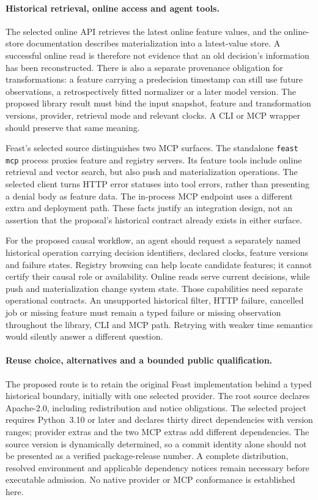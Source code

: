 \paragraph{Historical retrieval, online access and agent tools.}
The selected online API retrieves the latest online feature values, and the
online-store documentation describes materialization into a latest-value
store. A successful online read is therefore not evidence that an old
decision's information has been reconstructed. There is also a separate
provenance obligation for transformations: a feature carrying a predecision
timestamp can still use future observations, a retrospectively fitted
normalizer or a later model version. The proposed library result must bind
the input snapshot, feature and transformation versions, provider, retrieval
mode and relevant clocks. A CLI or MCP wrapper should preserve that same
meaning.~\citep{exec19_feast_source}

Feast's selected source distinguishes two MCP surfaces. The standalone
\texttt{feast mcp} process proxies feature and registry servers. Its feature
tools include online retrieval and vector search, but also push and
materialization operations. The selected client turns HTTP error statuses
into tool errors, rather than presenting a denial body as feature data. The
in-process MCP endpoint uses a different extra and deployment path. These
facts justify an integration design, not an assertion that the proposal's
historical contract already exists in either surface.~\citep{exec19_feast_source}

For the proposed causal workflow, an agent should request a separately named
historical operation carrying decision identifiers, declared clocks, feature
versions and failure states. Registry browsing can help locate candidate
features; it cannot certify their causal role or availability. Online reads
serve current decisions, while push and materialization change system state.
Those capabilities need separate operational contracts. An unsupported
historical filter, HTTP failure, cancelled job or missing feature must remain
a typed failure or missing observation throughout the library, CLI and MCP
path. Retrying with weaker time semantics would silently answer a different
question.

\paragraph{Reuse choice, alternatives and a bounded public qualification.}
The proposed route is to retain the original Feast implementation behind a
typed historical boundary, initially with one selected provider. The root
source declares Apache-2.0, including redistribution and notice obligations.
The selected project requires Python~3.10 or later and declares thirty direct
dependencies with version ranges; provider extras and the two MCP extras add
different dependencies. The source version is dynamically determined, so a
commit identity alone should not be presented as a verified package-release
number. A complete distribution, resolved environment and applicable
dependency notices remain necessary before executable admission. No native
provider or MCP conformance is established here.~\citep{exec19_feast_source}

